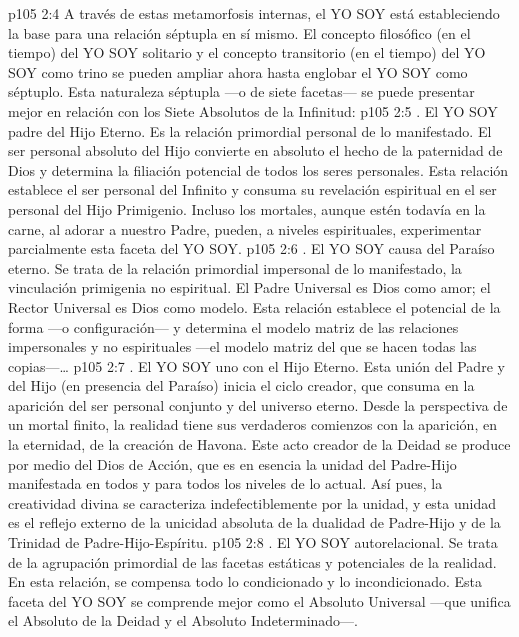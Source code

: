 \vs p105 2:4 A través de estas metamorfosis internas, el YO SOY está estableciendo la base para una relación séptupla en sí mismo. El concepto filosófico (en el tiempo) del YO SOY solitario y el concepto transitorio (en el tiempo) del YO SOY como trino se pueden ampliar ahora hasta englobar el YO SOY como séptuplo. Esta naturaleza séptupla ---o de siete facetas--- se puede presentar mejor en relación con los Siete Absolutos de la Infinitud:
\vs p105 2:5 . El YO SOY padre del Hijo Eterno. Es la relación primordial personal de lo manifestado. El ser personal absoluto del Hijo convierte en absoluto el hecho de la paternidad de Dios y determina la filiación potencial de todos los seres personales. Esta relación establece el ser personal del Infinito y consuma su revelación espiritual en el ser personal del Hijo Primigenio. Incluso los mortales, aunque estén todavía en la carne, al adorar a nuestro Padre, pueden, a niveles espirituales, experimentar parcialmente esta faceta del YO SOY.
\vs p105 2:6 . El YO SOY causa del Paraíso eterno. Se trata de la relación primordial impersonal de lo manifestado, la vinculación primigenia no espiritual. El Padre Universal es Dios como amor; el Rector Universal es Dios como modelo. Esta relación establece el potencial de la forma ---o configuración--- y determina el modelo matriz de las relaciones impersonales y no espirituales ---el modelo matriz del que se hacen todas las copias---\ldots
\vs p105 2:7 . El YO SOY uno con el Hijo Eterno. Esta unión del Padre y del Hijo (en presencia del Paraíso) inicia el ciclo creador, que consuma en la aparición del ser personal conjunto y del universo eterno. Desde la perspectiva de un mortal finito, la realidad tiene sus verdaderos comienzos con la aparición, en la eternidad, de la creación de Havona. Este acto creador de la Deidad se produce por medio del Dios de Acción, que es en esencia la unidad del Padre\hyp{}Hijo manifestada en todos y para todos los niveles de lo actual. Así pues, la creatividad divina se caracteriza indefectiblemente por la unidad, y esta unidad es el reflejo externo de la unicidad absoluta de la dualidad de Padre\hyp{}Hijo y de la Trinidad de Padre\hyp{}Hijo\hyp{}Espíritu.
\vs p105 2:8 . El YO SOY autorelacional. Se trata de la agrupación primordial de las facetas estáticas y potenciales de la realidad. En esta relación, se compensa todo lo condicionado y lo incondicionado. Esta faceta del YO SOY se comprende mejor como el Absoluto Universal ---que unifica el Absoluto de la Deidad y el Absoluto Indeterminado---.
